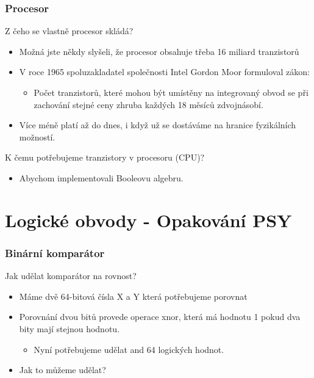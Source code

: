 \documentclass{beamer}
\begin{document}
\begin{frame}
\frametitle{Procesor}

Z čeho se vlastně procesor skládá?
\begin{itemize}
\item Možná jste někdy slyšeli, že procesor obsahuje třeba 16 miliard tranzistorů
\item V roce 1965 spoluzakladatel společnosti Intel Gordon Moor formuloval zákon: 
\begin{itemize}
\item Počet tranzistorů, které mohou být umístěny na integrovaný obvod se při zachování stejné ceny zhruba každých 18 měsíců zdvojnásobí.
\end{itemize}
\item Více méně platí až do dnes, i když už se dostáváme na hranice fyzikálních možností.
\end{itemize}

K čemu potřebujeme tranzistory v procesoru (CPU)?
\begin{itemize}
\item Abychom implementovali Booleovu algebru.
\end{itemize}
\end{frame}



\section{Logické obvody - Opakování PSY}

\begin{frame}
\frametitle{Binární komparátor}

Jak udělat komparátor na rovnost?
\begin{itemize}
\item Máme dvě 64-bitová čísla X a Y která potřebujeme porovnat
\item Porovnání dvou bitů provede operace xnor, která má hodnotu 1 pokud dva bity mají stejnou hodnotu.
\begin{itemize}
\item Nyní potřebujeme udělat and 64 logických hodnot.
\end{itemize}
\item Jak to můžeme udělat?
\end{itemize}
\end{frame}
\end{document}
